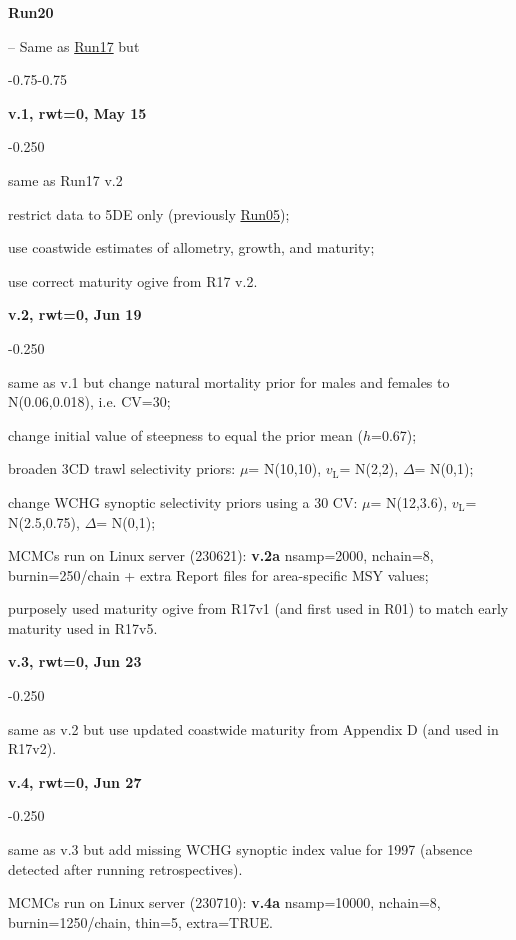 \hypertarget{R20}{\textbf{Run20}} -- Same as \hyperlink{R17}{Run17} but
\begin{itemize_csas}{-0.75}{-0.75}
	\item \textbf{v.1, rwt=0, May 15}
	\begin{itemize_csas}{-0.25}{0}
		\item same as Run17 v.2
		\item restrict data to 5DE only (previously \hyperlink{R05}{Run05});
		\item use coastwide estimates of allometry, growth, and maturity;
		\item use correct maturity ogive from R17 v.2.
	\end{itemize_csas}
	\item \textbf{v.2, rwt=0, Jun 19}
	\begin{itemize_csas}{-0.25}{0}
		\item same as v.1 but change natural mortality prior for males and females to N(0.06,0.018), i.e. CV=30\pc{};
		\item change initial value of steepness to equal the prior mean ($h$=0.67);
		\item broaden 3CD trawl selectivity priors: $\mu$= N(10,10), $v_\text{L}$= N(2,2), $\Delta$= N(0,1);
		\item change WCHG synoptic selectivity priors using a 30\pc{} CV: $\mu$= N(12,3.6), $v_\text{L}$= N(2.5,0.75), $\Delta$= N(0,1);
		\item MCMCs run on Linux server (230621): \textbf{v.2a} nsamp=2000, nchain=8, burnin=250/chain + extra Report files for area-specific MSY values;
		\item \alert{purposely used maturity ogive from R17v1 (and first used in R01) to match early maturity used in R17v5.}
	\end{itemize_csas}
	\item \textbf{v.3, rwt=0, Jun 23}
	\begin{itemize_csas}{-0.25}{0}
		\item same as v.2 but use updated coastwide maturity from Appendix D (and used in R17v2).
	\end{itemize_csas}
	\item \textbf{v.4, rwt=0, Jun 27}
	\begin{itemize_csas}{-0.25}{0}
		\item same as v.3 but add missing WCHG synoptic index value for 1997 (absence detected after running retrospectives).
		\item MCMCs run on Linux server (230710): \textbf{v.4a} nsamp=10000, nchain=8, burnin=1250/chain, thin=5, extra=TRUE.

\end{itemize_csas}
\end{itemize_csas}
